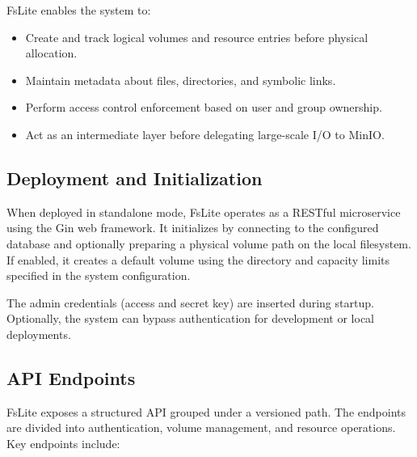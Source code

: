FsLite enables the system to:
\begin{itemize}
    \item Create and track logical volumes and resource entries before physical allocation.
    \item Maintain metadata about files, directories, and symbolic links.
    \item Perform access control enforcement based on user and group ownership.
    \item Act as an intermediate layer before delegating large-scale I/O to MinIO.
\end{itemize}

\subsection{Deployment and Initialization}

When deployed in standalone mode, FsLite operates as a RESTful microservice using the Gin web framework. It initializes by connecting to the configured database and optionally preparing a physical volume path on the local filesystem. If enabled, it creates a default volume using the directory and capacity limits specified in the system configuration.

The admin credentials (access and secret key) are inserted during startup. Optionally, the system can bypass authentication for development or local deployments.

\subsection{API Endpoints}

FsLite exposes a structured API grouped under a versioned path. The endpoints are divided into authentication, volume management, and resource operations. Key endpoints include:

